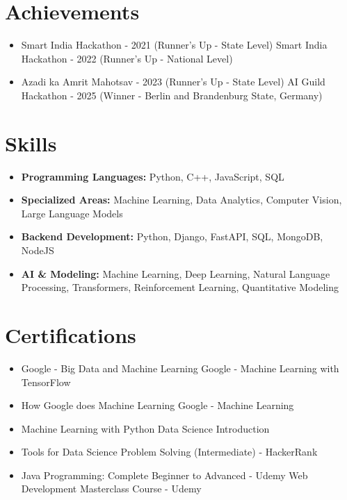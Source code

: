 \documentclass[a4paper,10pt]{article}
\begin{document}
\section*{Achievements}
\begin{itemize}
\item Smart India Hackathon - 2021 (Runner's Up - State Level) \hfill Smart India Hackathon - 2022 (Runner's Up - National Level)
\item Azadi ka Amrit Mahotsav - 2023 (Runner's Up - State Level) \hfill AI Guild Hackathon - 2025 (Winner - Berlin and Brandenburg State, Germany)
\end{itemize}

\section*{Skills}
\begin{itemize}
  \item \textbf{Programming Languages:} Python, C++, JavaScript, SQL
  \item \textbf{Specialized Areas:} Machine Learning, Data Analytics, Computer Vision, Large Language Models
  \item \textbf{Backend Development:} Python, Django, FastAPI, SQL, MongoDB, NodeJS
  \item \textbf{AI \& Modeling:} Machine Learning, Deep Learning, Natural Language Processing, Transformers, Reinforcement Learning, Quantitative Modeling
\end{itemize}

\section*{Certifications}
\begin{itemize}
\item Google - Big Data and Machine Learning \hfill Google - Machine Learning with TensorFlow
\item How Google does Machine Learning \hfill Google - Machine Learning
\item Machine Learning with Python \hfill Data Science Introduction
\item Tools for Data Science \hfill Problem Solving (Intermediate) - HackerRank
\item Java Programming: Complete Beginner to Advanced - Udemy \hfill Web Development Masterclass Course - Udemy
\end{itemize}
\end{document}
